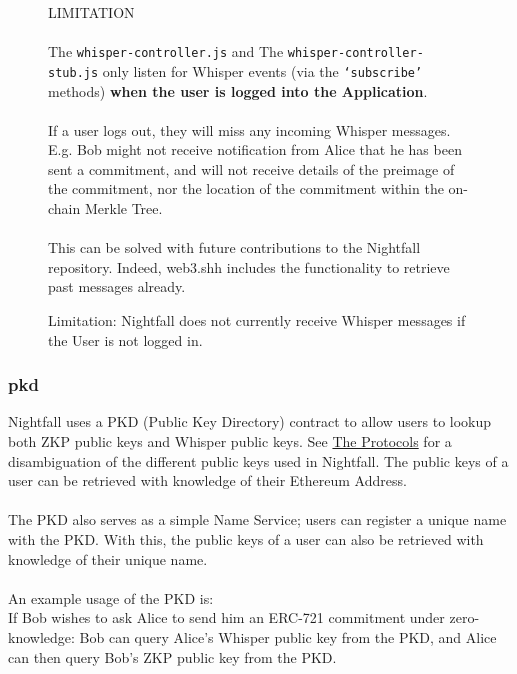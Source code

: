 \begin{figure}[h]
  \begin{center}
    \begin{mdframed}[backgroundcolor=verylightred]
      \noindent
      LIMITATION\\
      \\
      The \texttt{whisper-controller.js} and The \texttt{whisper-controller-stub.js} only listen for Whisper events (via the \texttt{`subscribe'} methods) \textbf{when the user is logged into the Application}.\\
      \\
      If a user logs out, they will miss any incoming Whisper messages. E.g. Bob might not receive notification from Alice that he has been sent a commitment, and will not receive details of the preimage of the commitment, nor the location of the commitment within the on-chain Merkle Tree.\\
      \\
      This can be solved with future contributions to the Nightfall repository. Indeed, web3.shh includes the functionality to retrieve past messages already.
    \end{mdframed}
  \end{center}
  \caption{Limitation: Nightfall does not currently receive Whisper messages if the User is not logged in.}
\end{figure}

\subsubsection{pkd}
\label{sec:pkd}

Nightfall uses a PKD (Public Key Directory) contract to allow users to lookup both ZKP public keys and Whisper public keys. See \hyperref[part:theProtocols]{The Protocols} for a disambiguation of the different public keys used in Nightfall. The public keys of a user can be retrieved with knowledge of their Ethereum Address.\\
\\
The PKD also serves as a simple Name Service; users can register a unique name with the PKD. With this, the public keys of a user can also be retrieved with knowledge of their unique name.\\
\\
An example usage of the PKD is:\\
If Bob wishes to ask Alice to send him an ERC-721 commitment under zero-knowledge: Bob can query Alice's Whisper public key from the PKD, and Alice can then query Bob's ZKP public key from the PKD.


